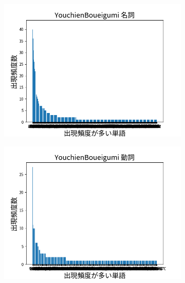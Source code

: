 \documentclass[onecolumn]{ujarticle}   %
\begin{document}
	\begin{figure}[hb]
		\centering
		\begin{subfigure}{0.49\columnwidth}
			\centering
			\includegraphics[width=1.0\columnwidth]{data/meisi_YouchienBoueigumi.png}
		\end{subfigure}
		\begin{subfigure}{0.49\columnwidth}
			\centering
			\includegraphics[width=1.0\columnwidth]{data/dousi_YouchienBoueigumi.png}
		\end{subfigure}
		\begin{subfigure}{0.49\columnwidth}
			\centering

\end{subfigure}
\end{figure}
\end{document}
